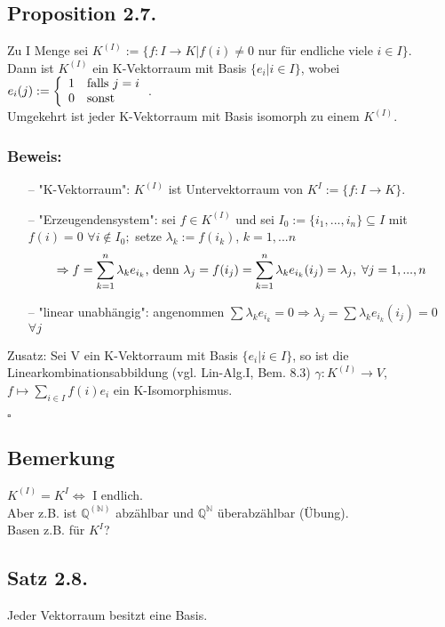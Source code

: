 \documentclass[a4paper,twoside]{article}
\newcommand{\twopartdef}[4] {
	\left\{
		\begin{array}{ll}
			#1 & #2 \\
			#3 & #4
		\end{array}
	\right.
}
\newcommand{\tn}[1]{\textnormal {#1}}
\begin{document}
\subsection*{Proposition 2.7.}
Zu I Menge sei $K^{(I)} := \{f:I\rightarrow K | f(i) \neq 0$ nur für endliche viele $i\in I\}$. \\
Dann ist $K^{(I)}$ ein K-Vektorraum mit Basis $\{e_i|i\in I\}$, wobei $e_i(j):= \twopartdef { 1 } {\tn{falls } j=i} {0} {\tn{sonst}}$. \\
Umgekehrt ist jeder K-Vektorraum mit Basis isomorph zu einem $K^{(I)}$.
\subsubsection*{Beweis:}
\begin{itemize}
\item[--] "K-Vektorraum": $K^{(I)}$ ist Untervektorraum von $K^I := \{f:I\rightarrow K\}$.
\item[--] "Erzeugendensystem": sei $f\in K^{(I)}$ und sei $I_0 := \{i_1,...,i_n\} \subseteq I$ mit $f(i) = 0$ $\forall i \notin I_0;$ setze $\lambda_k := f(i_k)$, $k=1,...n$ 
$$ \Rightarrow f = \sum_{k=1}^n \lambda_k e_{i_k}\tn{, denn }\lambda_j = f(i_j) = \sum_{k=1}^n \lambda_k e_{i_k}(i_j) = \lambda_j, \hspace*{1mm} \forall j = 1,...,n$$
\item[--] "linear unabhängig": angenommen $\sum \lambda_k e_{i_k} = 0 \Rightarrow \lambda_j = \sum \lambda_k e_{i_k}(i_j) = 0$ $\forall j$
\end{itemize}
Zusatz: Sei V ein K-Vektorraum mit Basis $\{e_i | i \in I\}$, so ist die Linearkombinationsabbildung (vgl. Lin-Alg.I, Bem. 8.3)
$\gamma: K^{(I)} \rightarrow V$, $f\mapsto \sum_{i\in I} f(i)e_i$ ein K-Isomorphismus.
\begin{flushright}
$\square$\\
\end{flushright}
\subsection*{Bemerkung}
$K^{(I)}=K^I \Leftrightarrow$ I endlich. \\
Aber z.B. ist $\mathbb Q^{(\mathbb N)}$ abzählbar und $\mathbb Q^\mathbb N$ überabzählbar (Übung). \\
Basen z.B. für $K^I$?
\subsection*{Satz 2.8.}
Jeder Vektorraum besitzt eine Basis.
\end{document}
